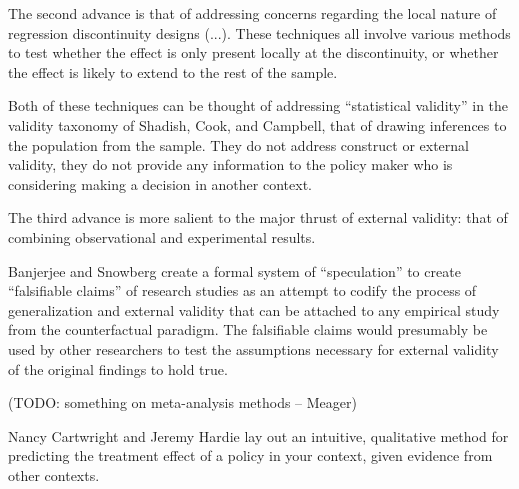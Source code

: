 \documentclass[a4paper,12pt]{article}
\begin{document}
The second advance is that of addressing concerns regarding the local nature of regression discontinuity designs (...). These techniques all involve various methods to test whether the effect is only present locally at the discontinuity, or whether the effect is likely to extend to the rest of the sample.

Both of these techniques can be thought of addressing ``statistical validity'' in the validity taxonomy of Shadish, Cook, and Campbell, that of drawing inferences to the population from the sample. They do not address construct or external validity, they do not provide any information to the policy maker who is considering making a decision in another context.

The third advance is more salient to the major thrust of external validity: that of combining observational and experimental results.








Banjerjee and Snowberg \parencite*{Snowberg2016} create a formal system of ``speculation'' to create ``falsifiable claims'' of research studies as an attempt to codify the process of generalization and external validity that can be attached to any empirical study from the counterfactual paradigm. The falsifiable claims would presumably be used by other researchers to test the assumptions necessary for external validity of the original findings to hold true.

(TODO: something on meta-analysis methods -- Meager)

Nancy Cartwright and Jeremy Hardie \parencite*{Cartwright2013} lay out an intuitive, qualitative method for predicting the treatment effect of a policy in your context, given evidence from other contexts. 



\end{document}
